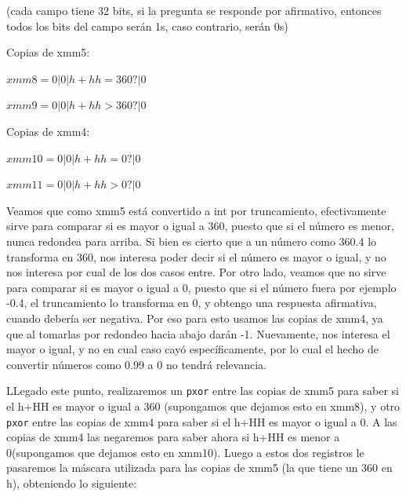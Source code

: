 \documentclass[a4paper]{article}
\begin{document}
\vspace*{0.3cm}

(cada campo tiene 32 bits, si la pregunta se responde por afirmativo, entonces todos los bits del campo serán 1s, caso contrario, serán 0s)

\vspace*{0.3cm}

Copias de xmm5:

\vspace*{0.3cm}

$xmm8= 0 | 0 | h+hh = 360? | 0$

\vspace*{0.3cm} 

$xmm9=0 | 0 | h+hh > 360? | 0$

\vspace*{0.3cm}

Copias de xmm4:

\vspace*{0.3cm}

$xmm10= 0 | 0 | h+hh = 0? | 0$

\vspace*{0.3cm}

$xmm11= 0 | 0 | h+hh > 0? | 0$

\vspace*{0.3cm}

Veamos que como xmm5 está convertido a int por truncamiento, efectivamente sirve para comparar si es mayor o igual a 360, puesto que si el número es menor, nunca redondea para arriba. Si bien es cierto que a un número como 360.4 lo transforma en 360, nos interesa poder decir si el número es mayor o igual, y no nos interesa por cual de los dos casos entre. Por otro lado, veamos que no sirve para comparar si es mayor o igual a 0, puesto que si el número fuera por ejemplo -0.4, el truncamiento lo transforma en 0, y obtengo una respuesta afirmativa, cuando debería ser negativa. Por eso para esto usamos las copias de xmm4, ya que al tomarlas por redondeo hacia abajo darán -1. Nuevamente, nos interesa el mayor o igual, y no en cual caso cayó específicamente, por lo cual el hecho de convertir números como 0.99 a 0 no tendrá relevancia.

LLegado este punto, realizaremos un {\tt pxor} entre las copias de xmm5 para saber si el h+HH es mayor o igual a 360 (supongamos que dejamos esto en xmm8), y otro {\tt pxor} entre las copias de xmm4 para saber si el h+HH es mayor o igual a 0. A las copias de xmm4 las negaremos para saber ahora si h+HH es menor a 0(supongamos que dejamos esto en xmm10). Luego a estos dos registros le pasaremos la máscara utilizada para las copias de xmm5 (la que tiene un 360 en h), obteniendo lo siguiente:
\end{document}
